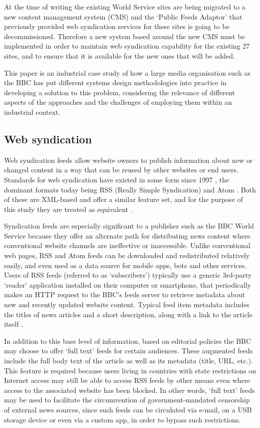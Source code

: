 \documentclass[runningheads,a4paper]{llncs}
\begin{document}
At the time of writing the existing World Service sites are being migrated to a new content management system (CMS) and the `Public Feeds Adaptor' that previously provided web syndication services for these sites is going to be decommissioned. Therefore a new system based around the new CMS must be implemented in order to maintain web syndication capability for the existing 27 sites, and to ensure that it is available for the new ones that will be added.

This paper is an industrial case study of how a large media organisation such as the BBC has put different systems design methodologies into practice in developing a solution to this problem, considering the relevance of different aspects of the approaches and the challenges of employing them within an industrial context.

\subsection{Web syndication}

Web syndication feeds allow website owners to publish information about new or changed content in a way that can be reused by other websites or end users. Standards for web syndication have existed in some form since 1997 \cite{w3c1997}, the dominant formats today being RSS (Really Simple Syndication) \cite{rss} and Atom \cite{atom}. Both of these are XML-based and offer a similar feature set, and for the purpose of this study they are treated as equivalent \cite{atomrss}.

Syndication feeds are especially significant to a publisher such as the BBC World Service because they offer an alternate path for distributing news content where conventional website channels are ineffective or inaccessible. Unlike conventional web pages, RSS and Atom feeds can be downloaded and redistributed relatively easily, and even used as a data source for mobile apps, bots and other services. Users of RSS feeds (referred to as `subscribers') typically use a generic 3rd-party `reader' application installed on their computer or smartphone, that periodically makes an HTTP request to the BBC's feeds server to retrieve metadata about new and recently updated website content. Typical feed item metadata includes the titles of news articles and a short description, along with a link to the article itself \cite{hmedeh}.

In addition to this base level of information, based on editorial policies the BBC may choose to offer `full text' feeds for certain audiences. These augmented feeds include the full body text of the article as well as its metadata (title, URL, etc.). This feature is required because users living in countries with state restrictions on Internet access may still be able to access RSS feeds by other means even where access to the associated website has been blocked. In other words, `full text' feeds may be used to facilitate the circumvention of government-mandated censorship of external news sources, since such feeds can be circulated via e-mail, on a USB storage device or even via a custom app, in order to bypass such restrictions.
\end{document}
